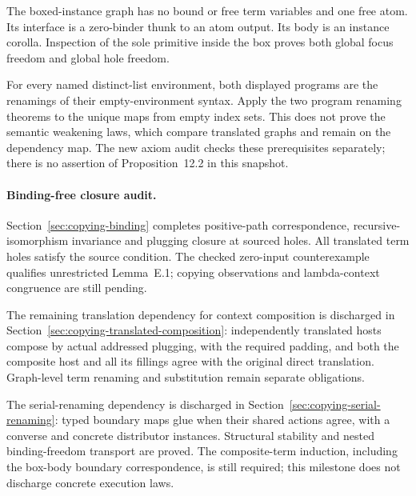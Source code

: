 


The boxed-instance graph has no bound or free term variables and one free
atom. Its interface is a zero-binder thunk to an atom output. Its body is an
instance corolla. Inspection of the sole primitive inside the box proves both
global focus freedom and global hole freedom.




For every named distinct-list environment, both displayed programs are the
renamings of their empty-environment syntax. Apply the two program renaming
theorems to the unique maps from empty index sets. This does not prove the
semantic weakening laws, which compare translated graphs and remain on the
dependency map. The new axiom audit checks these prerequisites separately;
there is no assertion of Proposition~12.2 in this snapshot.



\paragraph{Binding-free closure audit.}
Section~\ref{sec:copying-binding} completes positive-path correspondence,
recursive-isomorphism invariance and plugging closure at sourced holes.
All translated term holes satisfy the source condition. The checked
zero-input counterexample qualifies unrestricted Lemma~E.1; copying
observations and lambda-context congruence are still pending.


The remaining translation dependency for context composition is discharged in
Section~\ref{sec:copying-translated-composition}: independently translated hosts
compose by actual addressed plugging, with the required padding, and both the
composite host and all its fillings agree with the original direct translation.
Graph-level term renaming and substitution remain separate obligations.


The serial-renaming dependency is discharged in
Section~\ref{sec:copying-serial-renaming}: typed boundary maps glue when their
shared actions agree, with a converse and concrete distributor instances.
Structural stability and nested binding-freedom transport are proved. The
composite-term induction, including the box-body boundary correspondence, is
still required; this milestone does not discharge concrete execution laws.



